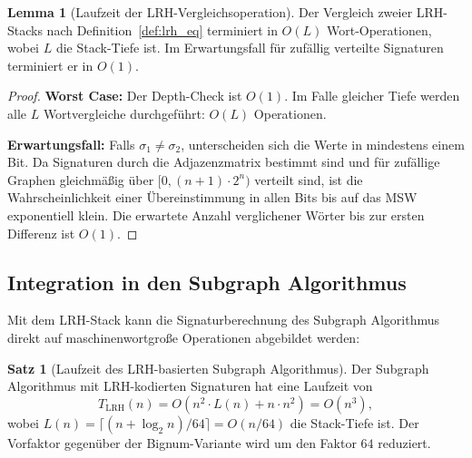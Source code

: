 ﻿\documentclass[a4paper,12pt]{article}
\theoremstyle{definition}
\newtheorem{satz}{Satz}
\newtheorem{lemma}{Lemma}
\begin{document}
\begin{lemma}[Laufzeit der LRH-Vergleichsoperation]
\label{lem:lrh_vergleich_laufzeit}
Der Vergleich zweier LRH-Stacks nach Definition~\ref{def:lrh_eq} terminiert in
$O(L)$ Wort-Operationen, wobei $L$ die Stack-Tiefe ist.
Im Erwartungsfall für zufällig verteilte Signaturen terminiert er in $O(1)$.
\end{lemma}

\begin{proof}
\textbf{Worst Case:} Der Depth-Check ist $O(1)$. Im Falle gleicher Tiefe werden
alle $L$ Wortvergleiche durchgeführt: $O(L)$ Operationen.

\textbf{Erwartungsfall:} Falls $\sigma_1 \neq \sigma_2$, unterscheiden sich die
Werte in mindestens einem Bit. Da Signaturen durch die Adjazenzmatrix bestimmt sind
und für zufällige Graphen gleichmäßig über $[0, (n+1) \cdot 2^n)$ verteilt sind,
ist die Wahrscheinlichkeit einer Übereinstimmung in allen Bits bis auf das MSW
exponentiell klein. Die erwartete Anzahl verglichener Wörter bis zur ersten
Differenz ist $O(1)$.
\end{proof}

\subsection{Integration in den Subgraph Algorithmus}

Mit dem LRH-Stack kann die Signaturberechnung des Subgraph Algorithmus direkt auf
maschinenwortgroße Operationen abgebildet werden:

\begin{satz}[Laufzeit des LRH-basierten Subgraph Algorithmus]
\label{satz:lrh_subgraph_laufzeit}
Der Subgraph Algorithmus mit LRH-kodier\-ten Signaturen hat eine Laufzeit von
\[
  T_{\mathrm{LRH}}(n) = O\!\left(n^2 \cdot L(n) + n \cdot n^2\right) = O(n^3),
\]
wobei $L(n) = \lceil (n + \log_2 n) / 64 \rceil = O(n/64)$ die Stack-Tiefe ist.
Der Vorfaktor gegenüber der Bignum-Variante wird um den Faktor $64$ reduziert.
\end{satz}
\end{document}
